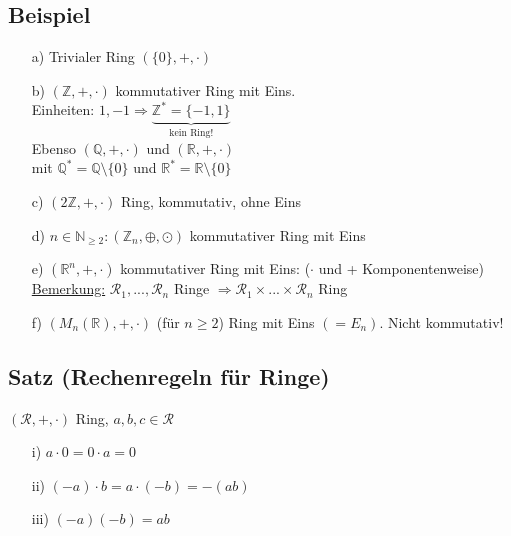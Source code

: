 \documentclass[a4paper, 12pt,titlepage, pdf, headsepline]{scrartcl}
\newcommand{\R}{\mathds{R}}
\newcommand{\uline}[1]{\underline{#1}}
\renewcommand{\>}{\rightarrow}
\renewcommand{\*}{\cdot}
\begin{document}
	      \subsection{Beispiel}
	      \label{4.2}
	      \begin{itemize}
	      	\item[a)] Trivialer Ring $(\{0\},+,\cdot)$
	      	\item[b)] $(\mathds{Z}, +,\cdot)$ kommutativer Ring mit Eins. \\
	      	      Einheiten: $1, -1\Rightarrow \underbrace{\mathds{Z}^* = \{-1,1\}}_{\text{kein Ring!}}$\\
	      	      Ebenso $(\mathds{Q},+,\cdot)$ und $(\mathds{R},+,\cdot)$ \\
	      	      mit $\mathds{Q}^* = \mathds{Q} \setminus \{0\}$ und $\mathds{R}^* =  \mathds{R} \setminus \{0\}$
	      	\item[c)] $(2\mathds{Z},+,\cdot)$ Ring, kommutativ, ohne Eins
	      	\item[d)] $n \in \mathds{N}_{\geq 2}: (\mathds{Z}_n, \oplus, \odot)$ kommutativer Ring mit Eins
	      	\item[e)] $(\R^n, + ,\cdot)$ kommutativer Ring mit Eins: ($\cdot$ und + Komponentenweise)\\
	      	      \uline{Bemerkung:} $\mathcal{R}_1,...,\mathcal{R}_n$ Ringe $\Rightarrow \mathcal{R}_1 \times ... \times \mathcal{R}_n$ Ring
	      	\item[f)] $(M_n(\R),+, \cdot)$ (für $n\geq 2$) Ring mit Eins $(= E_n)$. Nicht kommutativ! 
	      \end{itemize}
	      \subsection{Satz (Rechenregeln für Ringe)}
	      \label{4.3}
	      $(\mathcal{R}, +,\cdot)$ Ring, $a,b,c \in \mathcal{R}$
	      \begin{itemize}
	      	\item[i)] $a \cdot 0 = 0 \cdot a = 0$
	      	\item[ii)] $(-a) \cdot b = a \cdot (-b) = -(ab)$
	      	\item[iii)] $(-a)(-b) = ab$
	      \end{itemize}	
\end{document}
